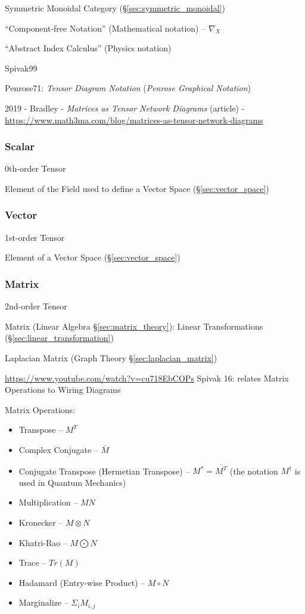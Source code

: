 Symmetric Monoidal Category (\S\ref{sec:symmetric_monoidal})

\asterism

``Component-free Notation'' (Mathematical notation) -- $\nabla_X$

``Abstract Index Calculus'' (Physics notation)

Spivak99

Penrose71: \emph{Tensor Diagram Notation} (\emph{Penrose Graphical Notation})

2019 - Bradley - \emph{Matrices as Tensor Network Diagrams} (article) -
\url{https://www.math3ma.com/blog/matrices-as-tensor-network-diagrams}



\subsubsection{Scalar}\label{sec:scalar}

0th-order Tensor

Element of the Field used to define a Vector Space
(\S\ref{sec:vector_space})



\subsubsection{Vector}\label{sec:vector}

1st-order Tensor

Element of a Vector Space (\S\ref{sec:vector_space})



\subsubsection{Matrix}\label{sec:matrix}

2nd-order Tensor

Matrix (Linear Algebra \S\ref{sec:matrix_theory}):
Linear Transformations (\S\ref{sec:linear_transformation})

Laplacian Matrix (Graph Theory \S\ref{sec:laplacian_matrix})

\url{https://www.youtube.com/watch?v=cu718EbCOPs} Spivak 16: relates
Matrix Operations to Wiring Diagrams %

Matrix Operations:
\begin{itemize}
\item Transpose -- $M^T$
\item Complex Conjugate -- $\overline{M}$
\item Conjugate Transpose (Hermetian Transpose) -- $M^* = \overline{M^T}$
  (the notation $M^\dag$ is used in Quantum Mechanics)
\item Multiplication -- $MN$
\item Kronecker -- $M \otimes N$
\item Khatri-Rao -- $M \bigodot N$
\item Trace -- $Tr(M)$
\item Hadamard (Entry-wise Product) -- $M \circ N$
\item Marginalize -- $\Sigma_i M_{i,j}$
\end{itemize}



